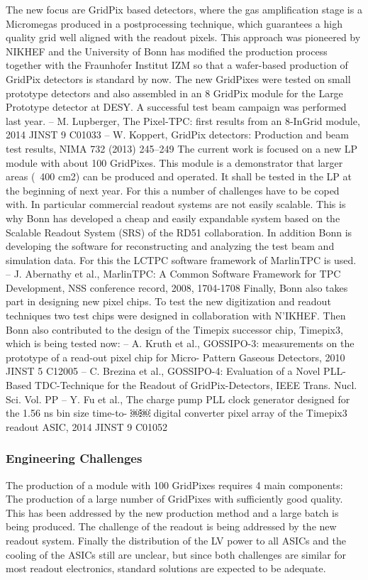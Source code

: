 The new focus are GridPix based detectors, where the gas amplification stage is a Micromegas produced in a postprocessing technique, which guarantees a high quality grid well aligned with the readout pixels. This approach was pioneered by NIKHEF and the University of Bonn has modified the production process together with the Fraunhofer Institut IZM so that a wafer-based production of GridPix detectors is standard by now. The new GridPixes were tested on small prototype detectors and also assembled in an 8 GridPix module for the Large Prototype detector at DESY. A successful test beam campaign was performed last year.
– M. Lupberger, The Pixel-TPC: first results from an 8-InGrid module, 2014 JINST 9 C01033
– W. Koppert, GridPix detectors: Production and beam test results, NIMA 732 (2013) 245–249 The current work is focused on a new LP module with about 100 GridPixes. This module is a demonstrator that larger areas (~400 cm2) can be produced and operated. It shall be tested in the LP at the beginning of next year. For this a number of challenges have to be coped with. In particular commercial readout systems are not easily scalable. This is why Bonn has developed a cheap and easily expandable system based on the Scalable Readout System (SRS) of the RD51 collaboration.
In addition Bonn is developing the software for reconstructing and analyzing the test beam and simulation data. For this the LCTPC software framework of MarlinTPC is used.
– J. Abernathy et al., MarlinTPC: A Common Software Framework for TPC Development, NSS conference record, 2008, 1704-1708
Finally, Bonn also takes part in designing new pixel chips. To test the new digitization and readout techniques two test chips were designed in collaboration with N'IKHEF. Then Bonn also contributed to the design of the Timepix successor chip, Timepix3, which is being tested now:
– A. Kruth et al., GOSSIPO-3: measurements on the prototype of a read-out pixel chip for Micro- Pattern Gaseous Detectors, 2010 JINST 5 C12005
– C. Brezina et al., GOSSIPO-4: Evaluation of a Novel PLL-Based TDC-Technique for the Readout of GridPix-Detectors, IEEE Trans. Nucl. Sci. Vol. PP
– Y. Fu et al., The charge pump PLL clock generator designed for the 1.56 ns bin size time-to-
￼￼
digital converter pixel array of the Timepix3 readout ASIC, 2014 JINST 9 C01052
\subsubsection{Engineering Challenges}
The production of a module with 100 GridPixes requires 4 main components: The production of a
large number of GridPixes with sufficiently good quality. This has been addressed by the new production method and a large batch is being produced. The challenge of the readout is being addressed by the new readout system. Finally the distribution of the LV power to all ASICs and the cooling of the ASICs still are unclear, but since both challenges are similar for most readout electronics, standard solutions are expected to be adequate.

